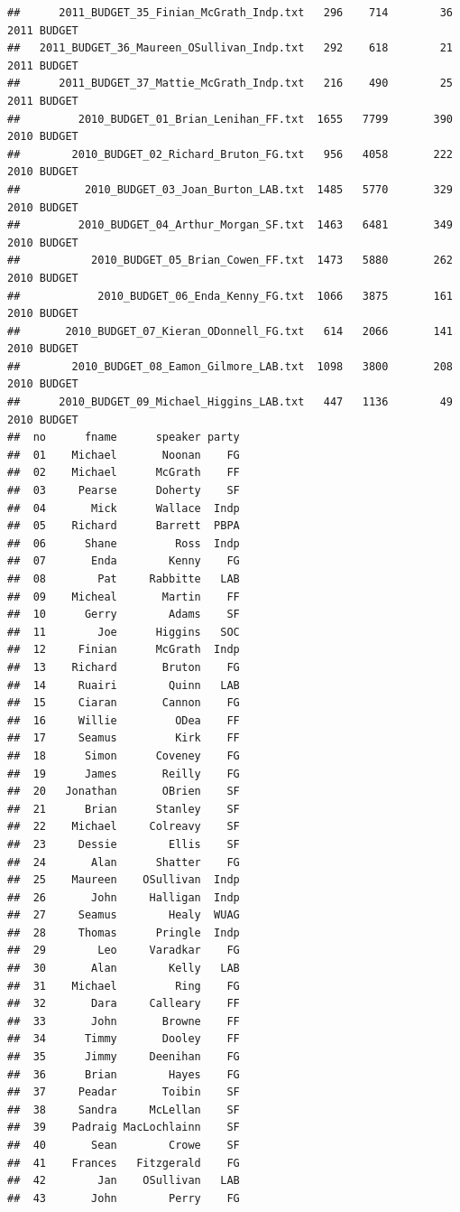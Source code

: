 \documentclass[11pt]{article}\usepackage[]{graphicx}\usepackage[]{color}
\makeatletter
\newenvironment{kframe}{%
 \def\at@end@of@kframe{}%
 \ifinner\ifhmode%
  \def\at@end@of@kframe{\end{minipage}}%
  \begin{minipage}{\columnwidth}%
 \fi\fi%
 \def\FrameCommand##1{\hskip\@totalleftmargin \hskip-\fboxsep
 \colorbox{shadecolor}{##1}\hskip-\fboxsep
     \hskip-\linewidth \hskip-\@totalleftmargin \hskip\columnwidth}%
 \MakeFramed {\advance\hsize-\width
   \@totalleftmargin\z@ \linewidth\hsize
   \@setminipage}}%
 {\par\unskip\endMakeFramed%
 \at@end@of@kframe}
\newenvironment{knitrout}{}{} %
\makeatother
\begin{document}
\begin{knitrout}
\begin{kframe}
\begin{verbatim}
##      2011_BUDGET_35_Finian_McGrath_Indp.txt   296    714        36 2011 BUDGET
##   2011_BUDGET_36_Maureen_OSullivan_Indp.txt   292    618        21 2011 BUDGET
##      2011_BUDGET_37_Mattie_McGrath_Indp.txt   216    490        25 2011 BUDGET
##         2010_BUDGET_01_Brian_Lenihan_FF.txt  1655   7799       390 2010 BUDGET
##        2010_BUDGET_02_Richard_Bruton_FG.txt   956   4058       222 2010 BUDGET
##          2010_BUDGET_03_Joan_Burton_LAB.txt  1485   5770       329 2010 BUDGET
##         2010_BUDGET_04_Arthur_Morgan_SF.txt  1463   6481       349 2010 BUDGET
##           2010_BUDGET_05_Brian_Cowen_FF.txt  1473   5880       262 2010 BUDGET
##            2010_BUDGET_06_Enda_Kenny_FG.txt  1066   3875       161 2010 BUDGET
##       2010_BUDGET_07_Kieran_ODonnell_FG.txt   614   2066       141 2010 BUDGET
##        2010_BUDGET_08_Eamon_Gilmore_LAB.txt  1098   3800       208 2010 BUDGET
##      2010_BUDGET_09_Michael_Higgins_LAB.txt   447   1136        49 2010 BUDGET
##  no      fname      speaker party
##  01    Michael       Noonan    FG
##  02    Michael      McGrath    FF
##  03     Pearse      Doherty    SF
##  04       Mick      Wallace  Indp
##  05    Richard      Barrett  PBPA
##  06      Shane         Ross  Indp
##  07       Enda        Kenny    FG
##  08        Pat     Rabbitte   LAB
##  09    Micheal       Martin    FF
##  10      Gerry        Adams    SF
##  11        Joe      Higgins   SOC
##  12     Finian      McGrath  Indp
##  13    Richard       Bruton    FG
##  14     Ruairi        Quinn   LAB
##  15     Ciaran       Cannon    FG
##  16     Willie         ODea    FF
##  17     Seamus         Kirk    FF
##  18      Simon      Coveney    FG
##  19      James       Reilly    FG
##  20   Jonathan       OBrien    SF
##  21      Brian      Stanley    SF
##  22    Michael     Colreavy    SF
##  23     Dessie        Ellis    SF
##  24       Alan      Shatter    FG
##  25    Maureen    OSullivan  Indp
##  26       John     Halligan  Indp
##  27     Seamus        Healy  WUAG
##  28     Thomas      Pringle  Indp
##  29        Leo     Varadkar    FG
##  30       Alan        Kelly   LAB
##  31    Michael         Ring    FG
##  32       Dara     Calleary    FF
##  33       John       Browne    FF
##  34      Timmy       Dooley    FF
##  35      Jimmy     Deenihan    FG
##  36      Brian        Hayes    FG
##  37     Peadar       Toibin    SF
##  38     Sandra     McLellan    SF
##  39    Padraig MacLochlainn    SF
##  40       Sean        Crowe    SF
##  41    Frances   Fitzgerald    FG
##  42        Jan    OSullivan   LAB
##  43       John        Perry    FG

\end{verbatim}
\end{kframe}
\end{knitrout}
\end{document}

